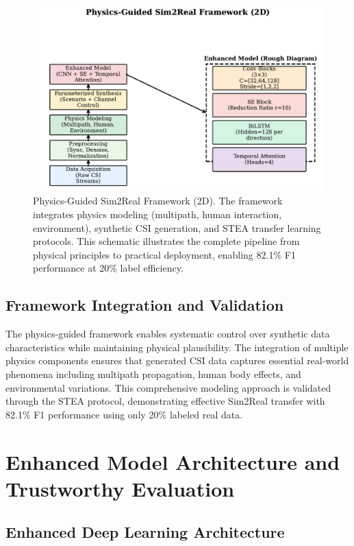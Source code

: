 \documentclass[journal]{IEEEtran}
\begin{document}
\begin{figure}[ht]
\centering
\includegraphics[width=\columnwidth]{figures/fig2_physics_guided_framework.pdf}%
\caption{Physics-Guided Sim2Real Framework (2D). The framework integrates physics modeling (multipath, human interaction, environment), synthetic CSI generation, and STEA transfer learning protocols. This schematic illustrates the complete pipeline from physical principles to practical deployment, enabling 82.1\% F1 performance at 20\% label efficiency.}
\label{fig:physics_3d_framework}
\end{figure}

\subsection{Framework Integration and Validation}

The physics-guided framework enables systematic control over synthetic data characteristics while maintaining physical plausibility. The integration of multiple physics components ensures that generated CSI data captures essential real-world phenomena including multipath propagation, human body effects, and environmental variations. This comprehensive modeling approach is validated through the STEA protocol, demonstrating effective Sim2Real transfer with 82.1\% F1 performance using only 20\% labeled real data.

\section{Enhanced Model Architecture and Trustworthy Evaluation}

\subsection{Enhanced Deep Learning Architecture}
\end{document}
